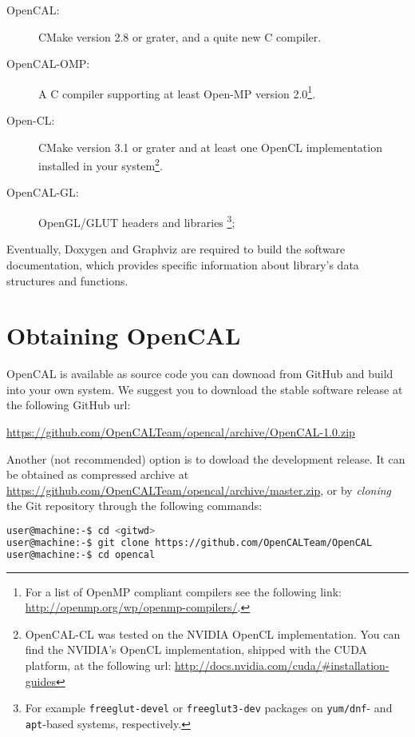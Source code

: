 \begin{description}
\item[OpenCAL: ] CMake version 2.8 or grater, and a quite new C
  compiler.
\item[OpenCAL-OMP: ] A C compiler supporting at least Open-MP version
  2.0\footnote{For a list of OpenMP compliant compilers see the
    following link: \url{http://openmp.org/wp/openmp-compilers/}.}.
\item[Open-CL: ] CMake version 3.1 or grater and at least one OpenCL
  implementation installed in your system\footnote{OpenCAL-CL was
    tested on the NVIDIA OpenCL implementation. You can find the
    NVIDIA's OpenCL implementation, shipped with the CUDA platform, at
    the following url:
    \url{http://docs.nvidia.com/cuda/\#installation-guides}}.
\item[OpenCAL-GL: ] OpenGL/GLUT headers and libraries \footnote{For
  example \texttt{freeglut-devel} or \texttt{freeglut3-dev} packages
  on \texttt{yum/dnf}- and \texttt{apt}-based systems, respectively.};
\end{description}

\noindent Eventually, Doxygen and Graphviz are required to build the
software documentation, which provides specific information about
library's data structures and functions.

\section{Obtaining OpenCAL}

OpenCAL is available as source code you can downoad from GitHub and
build into your own system. We suggest you to download the stable
software release at the following GitHub url:

\vspace{0.3cm}
\begin{center}
\url{https://github.com/OpenCALTeam/opencal/archive/OpenCAL-1.0.zip}
\end{center}
\vspace{0.3cm}

\noindent Another (not recommended) option is to dowload the
development release. It can be obtained as compressed archive at
\url{https://github.com/OpenCALTeam/opencal/archive/master.zip}, or by
\emph{cloning} the Git repository through the following commands:

\begin{lstlisting}[numbers=none,language=bash]
user@machine:-$ cd <gitwd>
user@machine:-$ git clone https://github.com/OpenCALTeam/OpenCAL
user@machine:-$ cd opencal
\end{lstlisting}

